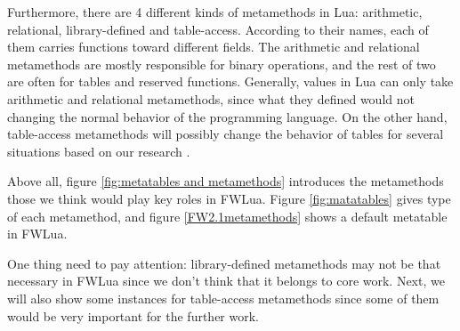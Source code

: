 Furthermore, there are 4 different kinds of metamethods in Lua: arithmetic, relational, library-defined and table-access. According to their names, each of them carries functions toward different fields. The arithmetic and relational metamethods are mostly responsible for binary operations, and the rest of two are often for tables and reserved functions. Generally, values in Lua can only take arithmetic and relational metamethods, since what they defined would not changing the normal behavior of the programming language. On the other hand, table-access metamethods will possibly change the behavior of tables for several situations based on our research \cite{PIL}.

Above all, figure \ref{fig:metatables and metamethods} introduces the metamethods those we think would play key roles in FWLua. Figure \ref{fig:matatables} gives type of each metamethod, and figure \ref{FW2.1metamethods} shows a default metatable in FWLua.

One thing need to pay attention: library-defined metamethods may not be that necessary in FWLua since we don't think that it belongs to core work. Next, we will also show some instances for table-access metamethods since some of them would be very important for the further work.

